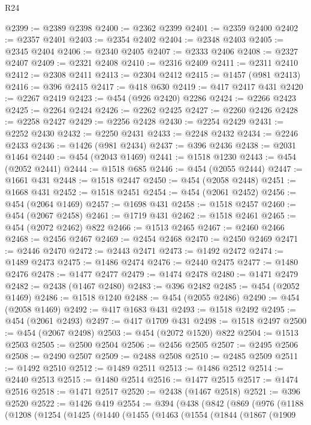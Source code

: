 \begin{lexlean}{R24}
\begin{coremodule}
@2399 := @2389 @2398
@2400 := @2362 @2399
@2401 := @2359 @2400
@2402 := @2357 @2401
@2403 := @2354 @2402
@2404 := @2348 @2403
@2405 := @2345 @2404
@2406 := @2340 @2405
@2407 := @2333 @2406
@2408 := @2327 @2407
@2409 := @2321 @2408
@2410 := @2316 @2409
@2411 := @2311 @2410
@2412 := @2308 @2411
@2413 := @2304 @2412
@2415 := @1457 (@981 @2413)
@2416 := @396 @2415
@2417 := @418 @630
@2419 := @417 @2417 @431
@2420 := @2267 @2419
@2423 := @454 (@926 @2420) @2286
@2424 := @2266 @2423
@2425 := @2264 @2424
@2426 := @2262 @2425
@2427 := @2260 @2426
@2428 := @2258 @2427
@2429 := @2256 @2428
@2430 := @2254 @2429
@2431 := @2252 @2430
@2432 := @2250 @2431
@2433 := @2248 @2432
@2434 := @2246 @2433
@2436 := @1426 (@981 @2434)
@2437 := @396 @2436
@2438 := @2031 @1464
@2440 := @454 (@2043 @1469)
@2441 := @1518 @1230
@2443 := @454 (@2052 @2441)
@2444 := @1518 @685
@2446 := @454 (@2055 @2444)
@2447 := @1661 @431
@2448 := @1518 @2447
@2450 := @454 (@2058 @2448)
@2451 := @1668 @431
@2452 := @1518 @2451
@2454 := @454 (@2061 @2452)
@2456 := @454 (@2064 @1469)
@2457 := @1698 @431
@2458 := @1518 @2457
@2460 := @454 (@2067 @2458)
@2461 := @1719 @431
@2462 := @1518 @2461
@2465 := @454 (@2072 @2462) @822
@2466 := @1513 @2465
@2467 := @2460 @2466
@2468 := @2456 @2467
@2469 := @2454 @2468
@2470 := @2450 @2469
@2471 := @2446 @2470
@2472 := @2443 @2471
@2473 := @1492 @2472
@2474 := @1489 @2473
@2475 := @1486 @2474
@2476 := @2440 @2475
@2477 := @1480 @2476
@2478 := @1477 @2477
@2479 := @1474 @2478
@2480 := @1471 @2479
@2482 := @2438 (@1467 @2480)
@2483 := @396 @2482
@2485 := @454 (@2052 @1469)
@2486 := @1518 @1240
@2488 := @454 (@2055 @2486)
@2490 := @454 (@2058 @1469)
@2492 := @417 @1683 @431
@2493 := @1518 @2492
@2495 := @454 (@2061 @2493)
@2497 := @417 @1709 @431
@2498 := @1518 @2497
@2500 := @454 (@2067 @2498)
@2503 := @454 (@2072 @1520) @822
@2504 := @1513 @2503
@2505 := @2500 @2504
@2506 := @2456 @2505
@2507 := @2495 @2506
@2508 := @2490 @2507
@2509 := @2488 @2508
@2510 := @2485 @2509
@2511 := @1492 @2510
@2512 := @1489 @2511
@2513 := @1486 @2512
@2514 := @2440 @2513
@2515 := @1480 @2514
@2516 := @1477 @2515
@2517 := @1474 @2516
@2518 := @1471 @2517
@2520 := @2438 (@1467 @2518)
@2521 := @396 @2520
@2522 := @1426 @419
@2554 := @394
    (@438
      (@842
        (@869
          (@976
            (@1188
              (@1208
                (@1254
                  (@1425
                    (@1440
                      (@1455
                        (@1463
                          (@1554
                            (@1844
                              (@1867
                                (@1909

\end{coremodule}
\end{lexlean}
